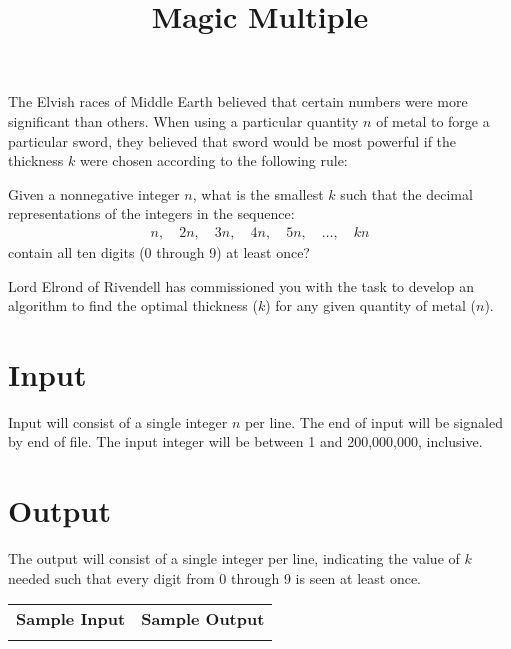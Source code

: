 \documentclass{article}
\title{Magic Multiple}
\date{}
\begin{document}
\maketitle

The Elvish races of Middle Earth believed that certain numbers were more
significant than others.  When using a particular quantity $n$ of metal to
forge a particular sword, they believed that sword would be most powerful if
the thickness $k$ were chosen according to the following rule:

Given a nonnegative integer $n$, what is the smallest $k$ such that the
decimal representations of the integers in the sequence:
\begin{eqnarray*}
    n,\quad 2n,\quad 3n,\quad 4n,\quad 5n,\quad \ldots,\quad kn
\end{eqnarray*}
contain all ten digits (0 through 9) at least once?

Lord Elrond of Rivendell has commissioned you with the task to develop
an algorithm to find the optimal thickness ($k$) for any given quantity of
metal ($n$).

\section{Input}

Input will consist of a single integer $n$ per line.  The end of input
will be signaled by end of file.  The input integer will be between 1
and 200,000,000, inclusive.

\section{Output}

The output will consist of a single integer per line, indicating the
value of $k$ needed such that every digit from 0 through 9 is seen 
at least once.

\vskip 16pt
\noindent
\setlength{\extrarowheight}{4pt}
\begin{tabularx}{\textwidth}{ | X | X | }
\hline
\textbf{Sample Input} & \textbf{Sample Output} \\

&

\\
\hline
\end{tabularx}
\end{document}
